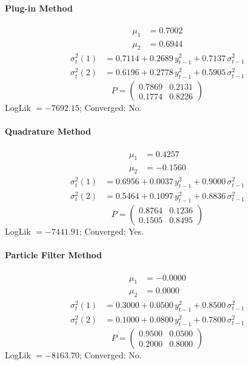 \documentclass[11pt, a4paper]{article}
\begin{document}
\paragraph{Plug-in Method}
\begin{align}
\mu_{1} &= 0.7002 \\
\mu_{2} &= 0.6944
\end{align}
\begin{align}
\sigma^2_{t}(1) &= 0.7114 + 0.2689\, y_{t-1}^2 + 0.7137\, \sigma^2_{t-1} \\
\sigma^2_{t}(2) &= 0.6196 + 0.2778\, y_{t-1}^2 + 0.5905\, \sigma^2_{t-1}
\end{align}
\begin{equation}
P = \begin{pmatrix} 0.7869 & 0.2131 \\ 0.1774 & 0.8226 \end{pmatrix}
\end{equation}
LogLik $= -7692.15$; Converged: No.

\paragraph{Quadrature Method}
\begin{align}
\mu_{1} &= 0.4257 \\
\mu_{2} &= -0.1560
\end{align}
\begin{align}
\sigma^2_{t}(1) &= 0.6956 + 0.0037\, y_{t-1}^2 + 0.9000\, \sigma^2_{t-1} \\
\sigma^2_{t}(2) &= 0.5464 + 0.1097\, y_{t-1}^2 + 0.8836\, \sigma^2_{t-1}
\end{align}
\begin{equation}
P = \begin{pmatrix} 0.8764 & 0.1236 \\ 0.1505 & 0.8495 \end{pmatrix}
\end{equation}
LogLik $= -7441.91$; Converged: Yes.

\paragraph{Particle Filter Method}
\begin{align}
\mu_{1} &= -0.0000 \\
\mu_{2} &= 0.0000
\end{align}
\begin{align}
\sigma^2_{t}(1) &= 0.3000 + 0.0500\, y_{t-1}^2 + 0.8500\, \sigma^2_{t-1} \\
\sigma^2_{t}(2) &= 0.1000 + 0.0800\, y_{t-1}^2 + 0.7800\, \sigma^2_{t-1}
\end{align}
\begin{equation}
P = \begin{pmatrix} 0.9500 & 0.0500 \\ 0.2000 & 0.8000 \end{pmatrix}
\end{equation}
LogLik $= -8163.70$; Converged: No.
\end{document}
